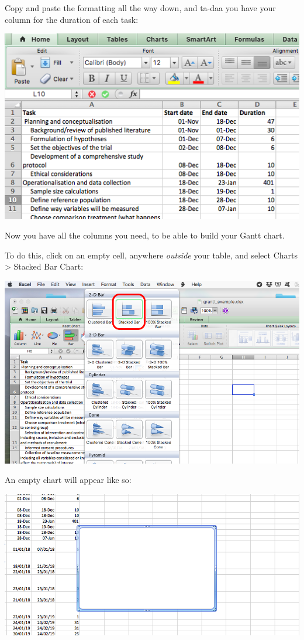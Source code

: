 \documentclass[
]{book}
\begin{document}
Copy and paste the formatting all the way down, and ta-daa you have your column for the duration of each task:

\includegraphics{imgs/all_cols_gantt.png}

Now you have all the columns you need, to be able to build your Gantt chart.

To do this, click on an empty cell, anywhere \emph{outside} your table, and select Charts \textgreater{} Stacked Bar Chart:

\includegraphics{imgs/gantt_select_bar.png}

An empty chart will appear like so:

\includegraphics{imgs/gantt_empty_chart.png}
\end{document}
